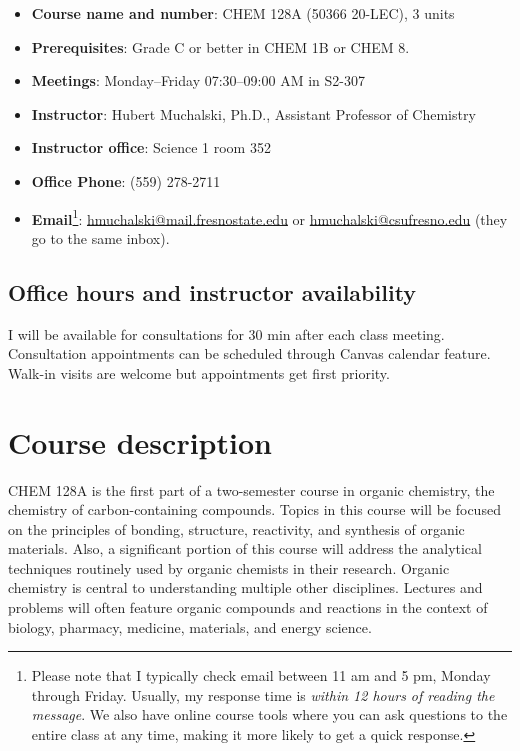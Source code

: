 \begin{itemize}
\tightlist
\item
  \textbf{Course name and number}: CHEM 128A (50366 20-LEC), 3 units
\item
  \textbf{Prerequisites}: Grade C or better in CHEM 1B or CHEM 8.
\item
  \textbf{Meetings}: Monday--Friday 07:30--09:00 AM in S2-307
\item
  \textbf{Instructor}: Hubert Muchalski, Ph.D., Assistant Professor of
  Chemistry
\item
  \textbf{Instructor office}: Science 1 room 352
\item
  \textbf{Office Phone}: (559) 278-2711
\item
  \textbf{Email}\footnote{Please note that I typically check email
    between 11 am and 5 pm, Monday through Friday. Usually, my response
    time is \emph{within 12 hours of reading the message}. We also have
    online course tools where you can ask questions to the entire class
    at any time, making it more likely to get a quick response.}:
  \url{hmuchalski@mail.fresnostate.edu} or
  \url{hmuchalski@csufresno.edu} (they go to the same inbox).
\end{itemize}

\hypertarget{office-hours-and-instructor-availability}{%
\subsection{Office hours and instructor
availability}\label{office-hours-and-instructor-availability}}

I will be available for consultations for 30 min after each class
meeting. Consultation appointments can be scheduled through Canvas
calendar feature. Walk-in visits are welcome but appointments get first
priority.

\hypertarget{course-description}{%
\section{Course description}\label{course-description}}

CHEM 128A is the first part of a two-semester course in organic
chemistry, the chemistry of carbon-containing compounds. Topics in this
course will be focused on the principles of bonding, structure,
reactivity, and synthesis of organic materials. Also, a significant
portion of this course will address the analytical techniques routinely
used by organic chemists in their research. Organic chemistry is central
to understanding multiple other disciplines. Lectures and problems will
often feature organic compounds and reactions in the context of biology,
pharmacy, medicine, materials, and energy science.

